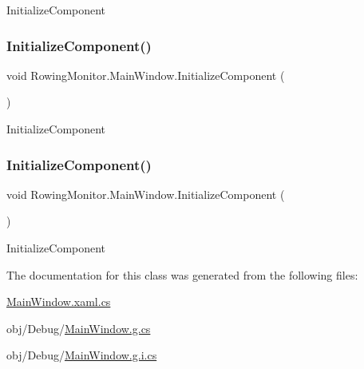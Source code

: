 Initialize\+Component 

\mbox{\label{class_rowing_monitor_1_1_main_window_afe76deea60e7fd9a534277f34037d22c}} 
\subsubsection{\texorpdfstring{Initialize\+Component()}{InitializeComponent()}\hspace{0.1cm}{\footnotesize\ttfamily [3/4]}}
{\footnotesize\ttfamily void Rowing\+Monitor.\+Main\+Window.\+Initialize\+Component (\begin{DoxyParamCaption}{ }\end{DoxyParamCaption})}



Initialize\+Component 

\mbox{\label{class_rowing_monitor_1_1_main_window_afe76deea60e7fd9a534277f34037d22c}} 
\subsubsection{\texorpdfstring{Initialize\+Component()}{InitializeComponent()}\hspace{0.1cm}{\footnotesize\ttfamily [4/4]}}
{\footnotesize\ttfamily void Rowing\+Monitor.\+Main\+Window.\+Initialize\+Component (\begin{DoxyParamCaption}{ }\end{DoxyParamCaption})}



Initialize\+Component 



The documentation for this class was generated from the following files\+:\begin{DoxyCompactItemize}
\item 
\hyperlink{_main_window_8xaml_8cs}{Main\+Window.\+xaml.\+cs}\item 
obj/\+Debug/\hyperlink{_debug_2_main_window_8g_8cs}{Main\+Window.\+g.\+cs}\item 
obj/\+Debug/\hyperlink{_debug_2_main_window_8g_8i_8cs}{Main\+Window.\+g.\+i.\+cs}\end{DoxyCompactItemize}
